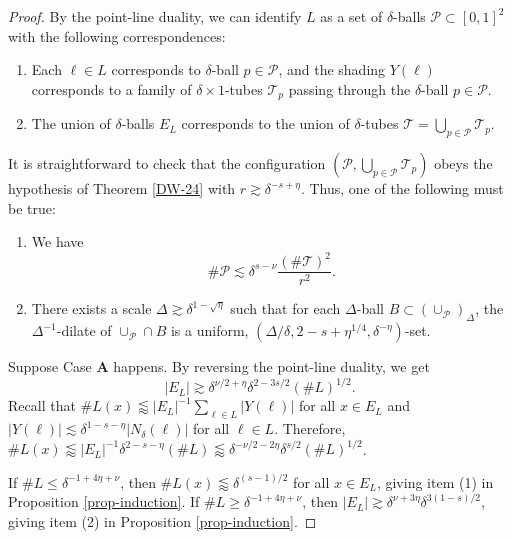 \documentclass{amsart}
\numberwithin{equation}{section}
\newcommand{\de}{\delta}
\newcommand{\De}{\Delta}
\newcommand{\cp}{\mathcal P}
\newcommand{\cT}{{\mathcal T}}
\begin{document}
\begin{proof}

By the point-line duality, we can identify $L$ as a set of $\de$-balls $\cp\subset[0,1]^2$ with the following correspondences:
\begin{enumerate}
    \item Each $\ell\in L$ corresponds to $\de$-ball $p\in \cp$, and the shading $Y(\ell)$ corresponds to a family of $\de\times1$-tubes $\cT_p$ passing through the $\de$-ball $p\in \cp$.
    \item The union of $\de$-balls $E_{L}$ corresponds to the union of $\de$-tubes $\cT=\bigcup_{p\in \cp} \cT_p$.
\end{enumerate}  
It is straightforward to check that the configuration $(\cp,\bigcup_{p\in\cp}\cT_p)$ obeys the hypothesis of Theorem \ref{DW-24} with $r\gtrsim\de^{-s+\eta}$. 
Thus, one of the following must be true:
\begin{enumerate}
    \item[{\bf A.}] We have
    \begin{equation}
        \#\cp \lesssim\de^{s-\nu}\frac{(\#\cT)^2}{r^2}.
    \end{equation}
    \item[{\bf B.}] There exists a scale $\De\gtrsim \de^{1-\sqrt{\eta}}$ such that for each $\De$-ball $B\subset (\cup_\cp)_\De$, the $\De^{-1}$-dilate of $\cup_\cp\cap B$ is a uniform, $(\De/\de, 2-s+\eta^{1/4}, \de^{-\eta})$-set.
\end{enumerate}

\smallskip

Suppose Case {\bf A} happens. 
By reversing the point-line duality, we get 
\begin{equation}
\label{DW-case-1}
    |E_L|\gtrsim \de^{\nu/2+\eta}\de^{2-3s/2}(\# L)^{1/2}.
\end{equation}
Recall that $\#L(x)\lessapprox |E_L|^{-1}\sum_{\ell\in L}|Y(\ell)|$ for all $x\in E_L$ and $|Y(\ell)|\lesssim\de^{1-s-\eta}|N_\de(\ell)|$ for all $\ell\in L$.
Therefore, $\#L(x)\lessapprox |E_L|^{-1}\de^{2-s-\eta}(\# L)\lessapprox\de^{-\nu/2-2\eta}\de^{s/2}(\# L)^{1/2}$. 

If $\# L\leq \de^{-1+4\eta+\nu}$, then $\# L(x)\lessapprox \de^{(s-1)/2}$ for all $x\in E_L$, giving item (1) in Proposition \ref{prop-induction}. 
If $\# L\geq \de^{-1+4\eta+\nu}$, then $|E_L|\gtrsim \de^{\nu+3\eta}\de^{3(1-s)/2}$, giving item (2) in Proposition \ref{prop-induction}.

\smallskip


\end{proof}
\end{document}
